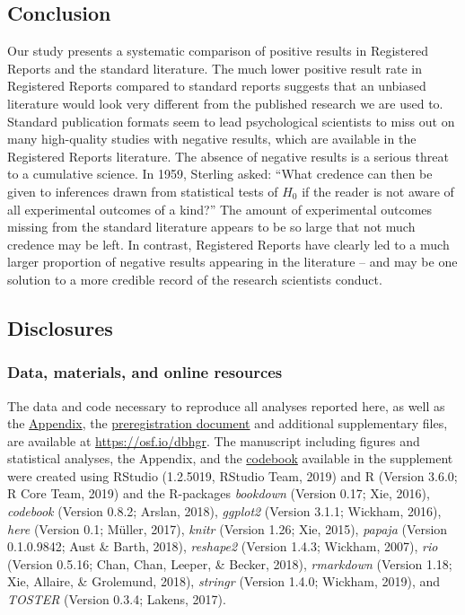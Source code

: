 \documentclass[british,,jou,floatsintext]{apa6}
\begin{document}
\hypertarget{conclusion}{%
\subsection{Conclusion}\label{conclusion}}

Our study presents a systematic comparison of positive results in Registered Reports and the standard literature. The much lower positive result rate in Registered Reports compared to standard reports suggests that an unbiased literature would look very different from the published research we are used to. Standard publication formats seem to lead psychological scientists to miss out on many high-quality studies with negative results, which are available in the Registered Reports literature. The absence of negative results is a serious threat to a cumulative science. In 1959, Sterling asked: \enquote{What credence can then be given to inferences drawn from statistical tests of \(H_0\) if the reader is not aware of all experimental outcomes of a kind?} The amount of experimental outcomes missing from the standard literature appears to be so large that not much credence may be left. In contrast, Registered Reports have clearly led to a much larger proportion of negative results appearing in the literature -- and may be one solution to a more credible record of the research scientists conduct.

\hypertarget{disclosures}{%
\subsection{Disclosures}\label{disclosures}}

\hypertarget{data-materials-and-online-resources}{%
\subsubsection{Data, materials, and online resources}\label{data-materials-and-online-resources}}

The data and code necessary to reproduce all analyses reported here, as well as the \href{https://osf.io/vcqya/}{Appendix}, the \href{https://osf.io/sy927/}{preregistration document} and additional supplementary files, are available at \url{https://osf.io/dbhgr}. The manuscript including figures and statistical analyses, the Appendix, and the \href{https://osf.io/6jrkz/}{codebook} available in the supplement were created using RStudio (1.2.5019, RStudio Team, 2019) and R (Version 3.6.0; R Core Team, 2019) and the R-packages \emph{bookdown} (Version 0.17; Xie, 2016), \emph{codebook} (Version 0.8.2; Arslan, 2018), \emph{ggplot2} (Version 3.1.1; Wickham, 2016), \emph{here} (Version 0.1; Müller, 2017), \emph{knitr} (Version 1.26; Xie, 2015), \emph{papaja} (Version 0.1.0.9842; Aust \& Barth, 2018), \emph{reshape2} (Version 1.4.3; Wickham, 2007), \emph{rio} (Version 0.5.16; Chan, Chan, Leeper, \& Becker, 2018), \emph{rmarkdown} (Version 1.18; Xie, Allaire, \& Grolemund, 2018), \emph{stringr} (Version 1.4.0; Wickham, 2019), and \emph{TOSTER} (Version 0.3.4; Lakens, 2017).
\end{document}
